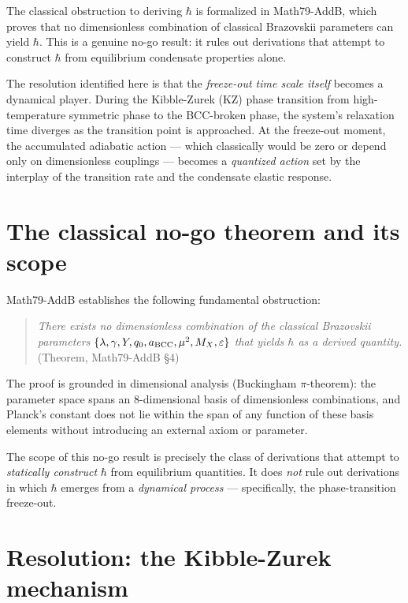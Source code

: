 The classical obstruction to deriving $\hbar$ is formalized in Math79-AddB,
which proves that no dimensionless combination of classical Brazovskii parameters
can yield $\hbar$. This is a genuine no-go result: it rules out derivations that
attempt to construct $\hbar$ from equilibrium condensate properties alone.

The resolution identified here is that the \emph{freeze-out time scale itself}
becomes a dynamical player. During the Kibble-Zurek (KZ) phase transition from
high-temperature symmetric phase to the BCC-broken phase, the system's relaxation
time diverges as the transition point is approached. At the freeze-out moment,
the accumulated adiabatic action — which classically would be zero or depend only
on dimensionless couplings — becomes a \emph{quantized action} set by the interplay
of the transition rate and the condensate elastic response.

\section{The classical no-go theorem and its scope}
Math79-AddB establishes the following fundamental obstruction:

\begin{quote}
\emph{There exists no dimensionless combination of the classical Brazovskii
parameters} $\{\lambda, \gamma, Y, q_0, a_{\rm BCC}, \mu^2, M_X, \varepsilon\}$
\emph{that yields $\hbar$ as a derived quantity.} (Theorem, Math79-AddB §4)
\end{quote}

The proof is grounded in dimensional analysis (Buckingham $\pi$-theorem): the
parameter space spans an 8-dimensional basis of dimensionless combinations, and
Planck's constant does not lie within the span of any function of these basis
elements without introducing an external axiom or parameter.

The scope of this no-go result is precisely the class of derivations that
attempt to \emph{statically construct} $\hbar$ from equilibrium quantities. It
does \emph{not} rule out derivations in which $\hbar$ emerges from a
\emph{dynamical process} — specifically, the phase-transition freeze-out.

\section{Resolution: the Kibble-Zurek mechanism}

